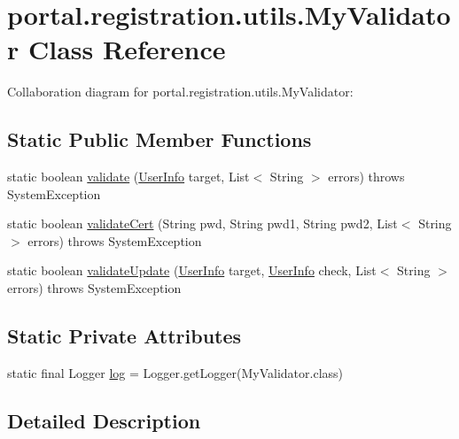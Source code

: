 \hypertarget{classportal_1_1registration_1_1utils_1_1MyValidator}{
\section{portal.registration.utils.MyValidator Class Reference}
\label{classportal_1_1registration_1_1utils_1_1MyValidator}
}


Collaboration diagram for portal.registration.utils.MyValidator:
\subsection*{Static Public Member Functions}
\begin{DoxyCompactItemize}
\item 
static boolean \hyperlink{classportal_1_1registration_1_1utils_1_1MyValidator_acdf993cfac49201b241d31284851e165}{validate} (\hyperlink{classportal_1_1registration_1_1domain_1_1UserInfo}{UserInfo} target, List$<$ String $>$ errors)  throws SystemException 
\item 
static boolean \hyperlink{classportal_1_1registration_1_1utils_1_1MyValidator_aeee5050b9c941e448aae3c399bec3da5}{validateCert} (String pwd, String pwd1, String pwd2, List$<$ String $>$ errors)  throws SystemException 
\item 
static boolean \hyperlink{classportal_1_1registration_1_1utils_1_1MyValidator_a6a9bff1eb67d2322fadae0eba39e1c22}{validateUpdate} (\hyperlink{classportal_1_1registration_1_1domain_1_1UserInfo}{UserInfo} target, \hyperlink{classportal_1_1registration_1_1domain_1_1UserInfo}{UserInfo} check, List$<$ String $>$ errors)  throws SystemException 
\end{DoxyCompactItemize}
\subsection*{Static Private Attributes}
\begin{DoxyCompactItemize}
\item 
static final Logger \hyperlink{classportal_1_1registration_1_1utils_1_1MyValidator_ac3007a0c35777d54f57ea95450baef66}{log} = Logger.getLogger(MyValidator.class)
\end{DoxyCompactItemize}


\subsection{Detailed Description}


